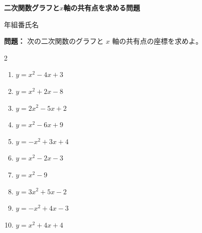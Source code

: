\documentclass[a4paper, 11pt]{jsarticle}
\begin{document}
\pagestyle{empty}

\begin{center}
    {\Large \textbf{二次関数\quad グラフと$x$軸の共有点を求める問題}}
\end{center}
\begin{flushright}
    年\hspace{1cm}組\hspace{1cm}番\hspace{1cm}氏名\hspace*{3.5cm} %
\end{flushright}
\vspace{3mm}

\noindent\textbf{問題：} 次の二次関数のグラフと $x$ 軸の共有点の座標を求めよ。
\vspace{5mm}

\begin{multicols*}{2}
\begin{enumerate}[label=(\arabic*)]
    \item $y = x^2 - 4x + 3$
    \vspace*{\fill}

    \item $y = x^2 + 2x - 8$
    \vspace*{\fill}

    \item $y = 2x^2 - 5x + 2$
    \vspace*{\fill}

    \item $y = x^2 - 6x + 9$
    \vspace*{\fill}

    \item $y = -x^2 + 3x + 4$
    \vspace*{\fill}
    
    \columnbreak

    \item $y = x^2 - 2x - 3$
    \vspace*{\fill}

    \item $y = x^2 - 9$
    \vspace*{\fill}

    \item $y = 3x^2 + 5x - 2$
    \vspace*{\fill}

    \item $y = -x^2 + 4x - 3$
    \vspace*{\fill}

    \item $y = x^2 + 4x + 4$
    \vspace*{\fill}

\end{enumerate}
\end{multicols*}
\end{document}
